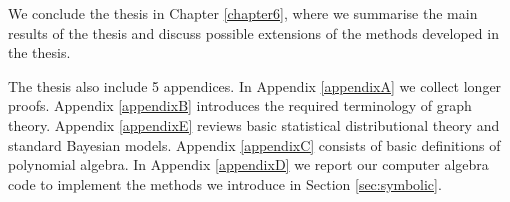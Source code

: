 We conclude the thesis in Chapter \ref{chapter6}, where we summarise the main results of the thesis and discuss possible extensions of the methods developed in the thesis. 

The thesis also include 5 appendices. In Appendix \ref{appendixA} we collect longer proofs. Appendix \ref{appendixB} introduces the required terminology of graph theory. Appendix \ref{appendixE} reviews basic statistical distributional theory and standard Bayesian models. Appendix \ref{appendixC} consists of basic definitions of polynomial algebra. In Appendix \ref{appendixD} we report our computer algebra code to implement the methods we introduce in Section \ref{sec:symbolic}. 